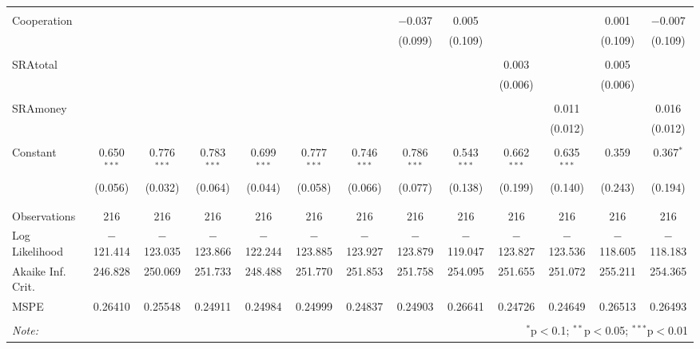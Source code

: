 \documentclass[12pt]{article}
\begin{document}
\begin{table}[!htbp]
\begin{adjustbox}{width=\textwidth}
\begin{tabular}{@{\extracolsep{5pt}}lcccccccccccc}
  & & & & & & & & & & & & \\ 
 Cooperation &  &  &  &  &  &  & $-$0.037 & 0.005 &  &  & 0.001 & $-$0.007 \\ 
  &  &  &  &  &  &  & (0.099) & (0.109) &  &  & (0.109) & (0.109) \\ 
  & & & & & & & & & & & & \\ 
 SRAtotal &  &  &  &  &  &  &  &  & 0.003 &  & 0.005 &  \\ 
  &  &  &  &  &  &  &  &  & (0.006) &  & (0.006) &  \\ 
  & & & & & & & & & & & & \\ 
 SRAmoney &  &  &  &  &  &  &  &  &  & 0.011 &  & 0.016 \\ 
  &  &  &  &  &  &  &  &  &  & (0.012) &  & (0.012) \\ 
  & & & & & & & & & & & & \\ 
 Constant & 0.650$^{***}$ & 0.776$^{***}$ & 0.783$^{***}$ & 0.699$^{***}$ & 0.777$^{***}$ & 0.746$^{***}$ & 0.786$^{***}$ & 0.543$^{***}$ & 0.662$^{***}$ & 0.635$^{***}$ & 0.359 & 0.367$^{*}$ \\ 
  & (0.056) & (0.032) & (0.064) & (0.044) & (0.058) & (0.066) & (0.077) & (0.138) & (0.199) & (0.140) & (0.243) & (0.194) \\ 
  & & & & & & & & & & & & \\ 
\hline \\[-1.8ex] 
Observations & 216 & 216 & 216 & 216 & 216 & 216 & 216 & 216 & 216 & 216 & 216 & 216 \\ 
Log Likelihood & $-$121.414 & $-$123.035 & $-$123.866 & $-$122.244 & $-$123.885 & $-$123.927 & $-$123.879 & $-$119.047 & $-$123.827 & $-$123.536 & $-$118.605 & $-$118.183 \\ 
Akaike Inf. Crit. & 246.828 & 250.069 & 251.733 & 248.488 & 251.770 & 251.853 & 251.758 & 254.095 & 251.655 & 251.072 & 255.211 & 254.365 \\ 
MSPE & 0.26410 & 0.25548 & 0.24911 & 0.24984 & 0.24999 & 0.24837 & 0.24903 & 0.26641 & 0.24726 & 0.24649 & 0.26513 & 0.26493 \\
\hline 
\hline \\[-1.8ex] 
\textit{Note:}  & \multicolumn{12}{r}{$^{*}$p$<$0.1; $^{**}$p$<$0.05; $^{***}$p$<$0.01} \\ 
\end{tabular} 
\end{adjustbox}
\end{table} 
\end{document}
